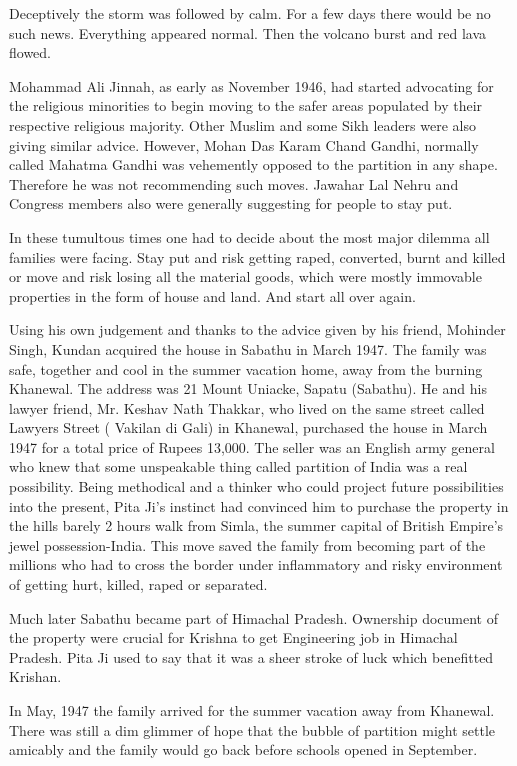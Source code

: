 Deceptively the storm was followed by calm. For a few days there would be no such news. Everything appeared normal. Then the volcano burst and red lava flowed. 

Mohammad Ali Jinnah, as early as November 1946, had started advocating for the religious minorities to begin moving to the safer areas populated by their respective religious majority. Other Muslim and some Sikh leaders were also giving similar advice. However, Mohan Das Karam Chand Gandhi, normally called Mahatma Gandhi was vehemently opposed to the partition in any shape. Therefore he was not recommending such moves. Jawahar Lal Nehru and Congress members also were generally suggesting for people to stay put. 

In these tumultous times one had to decide about the most major dilemma all families were facing. Stay put and risk getting raped, converted, burnt and killed or move and risk losing all the material goods, which were mostly immovable properties in the form of house and land. And start all over again. 

Using his own judgement and thanks to the advice given by his friend, Mohinder Singh, Kundan acquired the house in Sabathu in March 1947. The family was safe, together and cool in the summer vacation home, away from the burning Khanewal. The address was 21 Mount Uniacke, Sapatu (Sabathu). He and his lawyer friend, Mr. Keshav Nath Thakkar, who lived on the same street called Lawyers Street ( Vakilan di Gali) in Khanewal, purchased the house in March 1947 for a total price of Rupees 13,000. The seller was an English army general who knew that some unspeakable thing called partition of India was a real possibility. Being methodical and a thinker who could project future possibilities into the present, Pita Ji’s instinct had convinced him to purchase the property in the hills barely 2 hours walk from Simla, the summer capital of British Empire's jewel possession-India. This move saved the family from becoming part of the millions who had to cross the border under inflammatory and risky environment of getting hurt, killed, raped or separated. 

Much later Sabathu became part of Himachal Pradesh. Ownership document of the property were crucial for Krishna to get Engineering job in Himachal Pradesh. Pita Ji used to say that it was a sheer stroke of luck which benefitted Krishan. 

In May, 1947 the family arrived for the summer vacation away from Khanewal. There was still a dim glimmer of hope that the bubble of partition might settle amicably and the family would go back before schools opened in September. 

